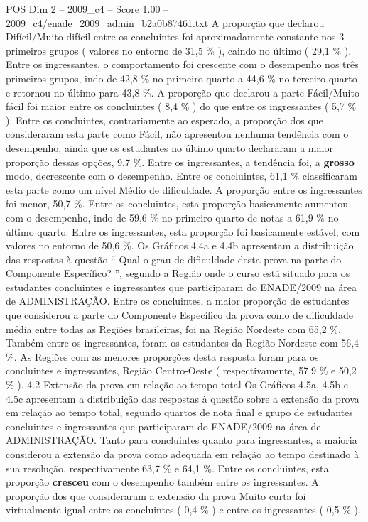 \begin{textsample}{POS Dim 2 – 2009\_c4 – Score 1.00 – 2009\_c4/enade\_2009\_admin\_b2a0b87461.txt}
A proporção que declarou Difícil/Muito difícil entre os concluintes foi aproximadamente constante nos 3 primeiros grupos ( valores no entorno de 31,5 \% ), caindo no último ( 29,1 \% ).
Entre os ingressantes, o comportamento foi crescente com o desempenho nos três primeiros grupos, indo de 42,8 \% no primeiro quarto a 44,6 \% no terceiro quarto e retornou no último para 43,8 \%.
A proporção que declarou a parte Fácil/Muito fácil foi maior entre os concluintes ( 8,4 \% ) do que entre os ingressantes ( 5,7 \% ).
Entre os concluintes, contrariamente ao esperado, a proporção dos que consideraram esta parte como Fácil, não apresentou nenhuma tendência com o desempenho, ainda que os estudantes no último quarto declararam a maior proporção dessas opções, 9,7 \%.
Entre os ingressantes, a tendência foi, a \textbf{grosso} modo, decrescente com o desempenho.
Entre os concluintes, 61,1 \% classificaram esta parte como um nível Médio de dificuldade.
A proporção entre os ingressantes foi menor, 50,7 \%.
Entre os concluintes, esta proporção basicamente aumentou com o desempenho, indo de 59,6 \% no primeiro quarto de notas a 61,9 \% no último quarto.
Entre os ingressantes, esta proporção foi basicamente estável, com valores no entorno de 50,6 \%.
Os Gráficos 4.4a e 4.4b apresentam a distribuição das respostas à questão “ Qual o grau de dificuldade desta prova na parte do Componente Específico? ”, segundo a Região onde o curso está situado para os estudantes concluintes e ingressantes que participaram do ENADE/2009 na área de ADMINISTRAÇÃO.
Entre os concluintes, a maior proporção de estudantes que considerou a parte do Componente Específico da prova como de dificuldade média entre todas as Regiões brasileiras, foi na Região Nordeste com 65,2 \%.
Também entre os ingressantes, foram os estudantes da Região Nordeste com 56,4 \%.
As Regiões com as menores proporções desta resposta foram para os concluintes e ingressantes, Região Centro-Oeste ( respectivamente, 57,9 \% e 50,2 \% ). 4.2 Extensão da prova em relação ao tempo total Os Gráficos 4.5a, 4.5b e 4.5c apresentam a distribuição das respostas à questão sobre a extensão da prova em relação ao tempo total, segundo quartos de nota final e grupo de estudantes concluintes e ingressantes que participaram do ENADE/2009 na área de ADMINISTRAÇÃO.
Tanto para concluintes quanto para ingressantes, a maioria considerou a extensão da prova como adequada em relação ao tempo destinado à sua resolução, respectivamente 63,7 \% e 64,1 \%.
Entre os concluintes, esta proporção \textbf{cresceu} com o desempenho também entre os ingressantes.
A proporção dos que consideraram a extensão da prova Muito curta foi virtualmente igual entre os concluintes ( 0,4 \% ) e entre os ingressantes ( 0,5 \% ).

\end{textsample}
